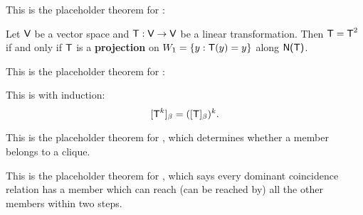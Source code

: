 \begin{additional theorem} \label{athm 2.31}
This is the placeholder theorem for :

Let \(\textsf{V}\) be a vector space and \(\textsf{T} : \textsf{V} \to \textsf{V}\) be a linear transformation.
Then \(\textsf{T} = \textsf{T}^2\) if and only if \(\textsf{T}\) is a \textbf{projection} on \(W_1 = \{ y : \textsf{T}(y) = y \}\)
along \(\textsf{N(T)}\).
\end{additional theorem}

\begin{additional theorem} \label{athm 2.32}
This is the placeholder theorem for :

This is  with induction:
\[
    [\textsf{T}^k]_{\beta} = ([\textsf{T}]_{\beta})^k.
\]
\end{additional theorem}

\begin{additional theorem} \label{athm 2.33}
This is the placeholder theorem for , which determines whether a member belongs to a clique.
\end{additional theorem}

\begin{additional theorem} \label{athm 2.34}
This is the placeholder theorem for , which says every dominant coincidence relation has a member which can reach (can be reached by) all the other members within two steps.
\end{additional theorem}
